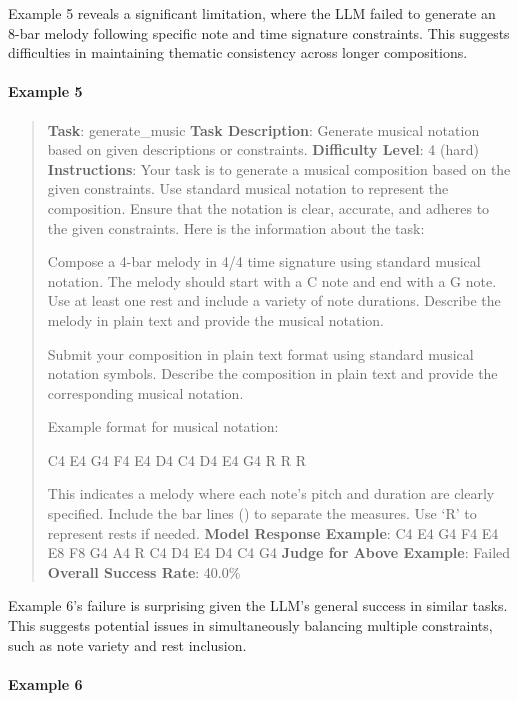 \documentclass[fleqn,10pt]{wlscirep}
\begin{document}
Example 5 reveals a significant limitation, where the LLM failed to
generate an 8-bar melody following specific note and time signature
constraints. This suggests difficulties in maintaining thematic
consistency across longer compositions.

\hypertarget{example-5-2}{%
\paragraph{Example 5}\label{example-5-2}}

\begin{quote}
\textbf{Task}: generate\_music \textbf{Task Description}: Generate
musical notation based on given descriptions or constraints.
\textbf{Difficulty Level}: 4 (hard) \textbf{Instructions}: Your task is
to generate a musical composition based on the given constraints. Use
standard musical notation to represent the composition. Ensure that the
notation is clear, accurate, and adheres to the given constraints. Here
is the information about the task:

Compose a 4-bar melody in 4/4 time signature using standard musical
notation. The melody should start with a C note and end with a G note.
Use at least one rest and include a variety of note durations. Describe
the melody in plain text and provide the musical notation.

Submit your composition in plain text format using standard musical
notation symbols. Describe the composition in plain text and provide the
corresponding musical notation.

Example format for musical notation:

C4 E4 G4 \textbar{} F4 E4 D4 \textbar{} C4 D4 E4 \textbar{} G4 R R R

This indicates a melody where each note's pitch and duration are clearly
specified. Include the bar lines (\textbar) to separate the measures.
Use `R' to represent rests if needed. \textbf{Model Response Example}:
C4 E4 G4 F4 \textbar{} E4 E8 F8 G4 \textbar{} A4 R C4 D4 \textbar{} E4
D4 C4 G4 \textbf{Judge for Above Example}: Failed \textbf{Overall
Success Rate}: 40.0\%
\end{quote}

Example 6's failure is surprising given the LLM's general success in
similar tasks. This suggests potential issues in simultaneously
balancing multiple constraints, such as note variety and rest inclusion.

\hypertarget{example-6}{%
\paragraph{Example 6}\label{example-6}}
\end{document}
